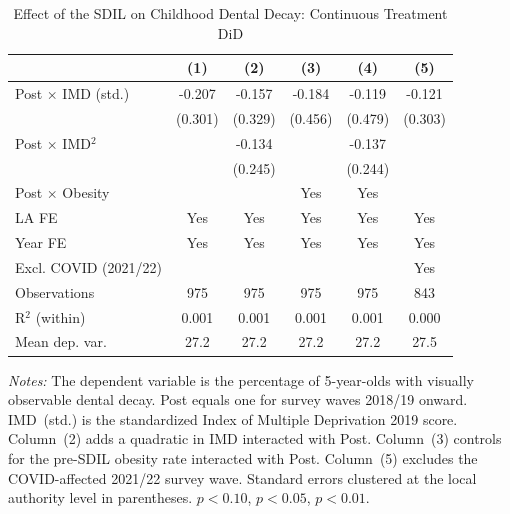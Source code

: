 \begin{table}[H]
\centering
\caption{Effect of the SDIL on Childhood Dental Decay: Continuous Treatment DiD}
\label{tab:main}
\begin{threeparttable}
\begin{tabular}{lccccc}
\toprule
 & (1) & (2) & (3) & (4) & (5) \\
\midrule
Post $\times$ IMD (std.) & -0.207 & -0.157 & -0.184 & -0.119 & -0.121 \\
 & (0.301) & (0.329) & (0.456) & (0.479) & (0.303) \\
\addlinespace
Post $\times$ IMD$^2$ & & -0.134 & & -0.137 & \\
 & & (0.245) & & (0.244) & \\
\addlinespace
Post $\times$ Obesity & & & Yes & Yes & \\
\midrule
LA FE & Yes & Yes & Yes & Yes & Yes \\
Year FE & Yes & Yes & Yes & Yes & Yes \\
Excl. COVID (2021/22) & & & & & Yes \\
Observations & 975 & 975 & 975 & 975 & 843 \\
R$^2$ (within) & 0.001 & 0.001 & 0.001 & 0.001 & 0.000 \\
Mean dep. var. & 27.2 & 27.2 & 27.2 & 27.2 & 27.5 \\
\bottomrule
\end{tabular}
\begin{tablenotes}[flushleft]
\small
\item \textit{Notes:} The dependent variable is the percentage of 5-year-olds with visually observable dental decay. Post equals one for survey waves 2018/19 onward. IMD~(std.) is the standardized Index of Multiple Deprivation 2019 score. Column~(2) adds a quadratic in IMD interacted with Post. Column~(3) controls for the pre-SDIL obesity rate interacted with Post. Column~(5) excludes the COVID-affected 2021/22 survey wave. Standard errors clustered at the local authority level in parentheses. \sym{*} $p<0.10$, \sym{**} $p<0.05$, \sym{***} $p<0.01$.
\end{tablenotes}
\end{threeparttable}
\end{table}

